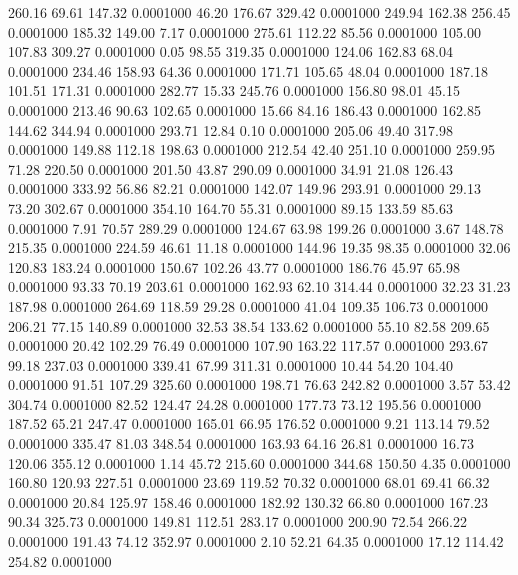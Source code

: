  260.16   69.61  147.32   0.0001000
  46.20  176.67  329.42   0.0001000
 249.94  162.38  256.45   0.0001000
 185.32  149.00    7.17   0.0001000
 275.61  112.22   85.56   0.0001000
 105.00  107.83  309.27   0.0001000
   0.05   98.55  319.35   0.0001000
 124.06  162.83   68.04   0.0001000
 234.46  158.93   64.36   0.0001000
 171.71  105.65   48.04   0.0001000
 187.18  101.51  171.31   0.0001000
 282.77   15.33  245.76   0.0001000
 156.80   98.01   45.15   0.0001000
 213.46   90.63  102.65   0.0001000
  15.66   84.16  186.43   0.0001000
 162.85  144.62  344.94   0.0001000
 293.71   12.84    0.10   0.0001000
 205.06   49.40  317.98   0.0001000
 149.88  112.18  198.63   0.0001000
 212.54   42.40  251.10   0.0001000
 259.95   71.28  220.50   0.0001000
 201.50   43.87  290.09   0.0001000
  34.91   21.08  126.43   0.0001000
 333.92   56.86   82.21   0.0001000
 142.07  149.96  293.91   0.0001000
  29.13   73.20  302.67   0.0001000
 354.10  164.70   55.31   0.0001000
  89.15  133.59   85.63   0.0001000
   7.91   70.57  289.29   0.0001000
 124.67   63.98  199.26   0.0001000
   3.67  148.78  215.35   0.0001000
 224.59   46.61   11.18   0.0001000
 144.96   19.35   98.35   0.0001000
  32.06  120.83  183.24   0.0001000
 150.67  102.26   43.77   0.0001000
 186.76   45.97   65.98   0.0001000
  93.33   70.19  203.61   0.0001000
 162.93   62.10  314.44   0.0001000
  32.23   31.23  187.98   0.0001000
 264.69  118.59   29.28   0.0001000
  41.04  109.35  106.73   0.0001000
 206.21   77.15  140.89   0.0001000
  32.53   38.54  133.62   0.0001000
  55.10   82.58  209.65   0.0001000
  20.42  102.29   76.49   0.0001000
 107.90  163.22  117.57   0.0001000
 293.67   99.18  237.03   0.0001000
 339.41   67.99  311.31   0.0001000
  10.44   54.20  104.40   0.0001000
  91.51  107.29  325.60   0.0001000
 198.71   76.63  242.82   0.0001000
   3.57   53.42  304.74   0.0001000
  82.52  124.47   24.28   0.0001000
 177.73   73.12  195.56   0.0001000
 187.52   65.21  247.47   0.0001000
 165.01   66.95  176.52   0.0001000
   9.21  113.14   79.52   0.0001000
 335.47   81.03  348.54   0.0001000
 163.93   64.16   26.81   0.0001000
  16.73  120.06  355.12   0.0001000
   1.14   45.72  215.60   0.0001000
 344.68  150.50    4.35   0.0001000
 160.80  120.93  227.51   0.0001000
  23.69  119.52   70.32   0.0001000
  68.01   69.41   66.32   0.0001000
  20.84  125.97  158.46   0.0001000
 182.92  130.32   66.80   0.0001000
 167.23   90.34  325.73   0.0001000
 149.81  112.51  283.17   0.0001000
 200.90   72.54  266.22   0.0001000
 191.43   74.12  352.97   0.0001000
   2.10   52.21   64.35   0.0001000
  17.12  114.42  254.82   0.0001000
